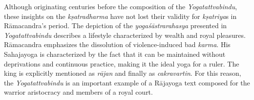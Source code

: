 Although originating centuries before the composition of the \textit{Yogatattvabindu}, these insights on the \textit{kṣatradharma} have not lost their validity for \textit{kṣatriya}s in Rāmacandra's period. The depiction of the \textit{yogaśāstrarahasya} presented in \emph{Yogatattvabindu}  describes a lifestyle characterized by wealth and royal pleasures. Rāmacandra emphasizes the dissolution of violence-induced bad \textit{karma}. His Sahajayoga is characterized by the fact that it can be maintained without deprivations and continuous practice, making it the ideal yoga for a ruler. The king is explicitly mentioned as \textit{rājan} and finally as \textit{cakravartin}. For this reason, the \textit{Yogatattvabindu} is an important example of a Rājayoga text composed for the warrior aristocracy and members of a royal court.

